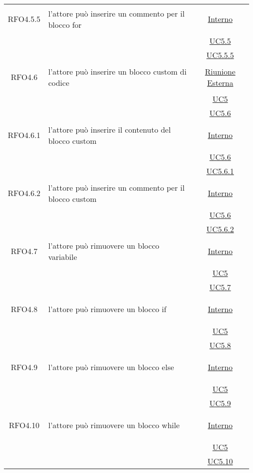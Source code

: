 \begin{longtable}{|c|>{\centering}m{7cm}|c|}
\hypertarget{RFO4.5.5}{RFO4.5.5} & l'attore può inserire un commento per il blocco for & \hyperlink{Interno}{Interno}\\
& &\hyperref[UC5.5]{UC5.5}\\
& &\hyperref[UC5.5.5]{UC5.5.5}\\ \hline

\hypertarget{RFO4.6}{RFO4.6} & l'attore può inserire un blocco custom di codice & \hyperlink{Riunione Esterna}{Riunione Esterna}\\
& &\hyperref[UC5]{UC5}\\
& &\hyperref[UC5.6]{UC5.6}\\ \hline

\hypertarget{RFO4.6.1}{RFO4.6.1} & l'attore può inserire il contenuto del blocco custom & \hyperlink{Interno}{Interno}\\
& &\hyperref[UC5.6]{UC5.6}\\
& &\hyperref[UC5.6.1]{UC5.6.1}\\ \hline

\hypertarget{RFO4.6.2}{RFO4.6.2} & l'attore può inserire un commento per il blocco custom & \hyperlink{Interno}{Interno}\\
& &\hyperref[UC5.6]{UC5.6}\\
& &\hyperref[UC5.6.2]{UC5.6.2}\\ \hline

\hypertarget{RFO4.7}{RFO4.7} & l'attore può rimuovere un blocco variabile &\hyperlink{Interno}{Interno}\\
& &\hyperref[UC5]{UC5}\\
& &\hyperref[UC5.7]{UC5.7}\\ \hline

\hypertarget{RFO4.8}{RFO4.8} & l'attore può rimuovere un blocco if & \hyperlink{Interno}{Interno}\\
& &\hyperref[UC5]{UC5}\\
& &\hyperref[UC5.8]{UC5.8}\\ \hline

\hypertarget{RFO4.9}{RFO4.9} & l'attore può rimuovere un blocco else & \hyperlink{Interno}{Interno}\\
& &\hyperref[UC5]{UC5}\\
& &\hyperref[UC5.9]{UC5.9}\\ \hline

\hypertarget{RFO4.10}{RFO4.10} & l'attore può rimuovere un blocco while & \hyperlink{Interno}{Interno}\\
& &\hyperref[UC5]{UC5}\\
& & \hyperref[UC5.10]{UC5.10}\\ \hline


\end{longtable}
